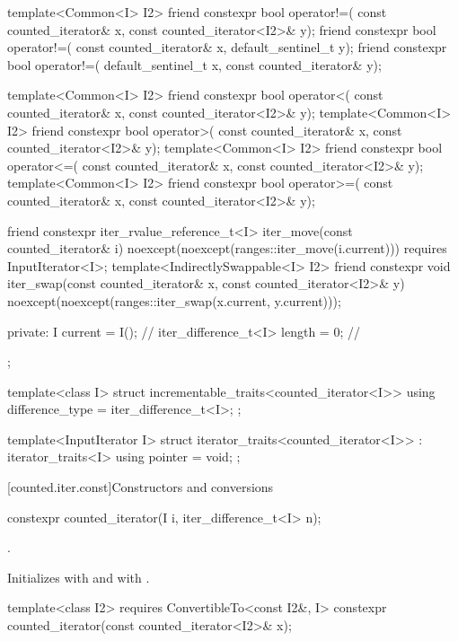 \begin{codeblock}
{{    template<Common<I> I2>
      friend constexpr bool operator!=(
        const counted_iterator& x, const counted_iterator<I2>& y);
    friend constexpr bool operator!=(
      const counted_iterator& x, default_sentinel_t y);
    friend constexpr bool operator!=(
      default_sentinel_t x, const counted_iterator& y);

    template<Common<I> I2>
      friend constexpr bool operator<(
        const counted_iterator& x, const counted_iterator<I2>& y);
    template<Common<I> I2>
      friend constexpr bool operator>(
        const counted_iterator& x, const counted_iterator<I2>& y);
    template<Common<I> I2>
      friend constexpr bool operator<=(
        const counted_iterator& x, const counted_iterator<I2>& y);
    template<Common<I> I2>
      friend constexpr bool operator>=(
        const counted_iterator& x, const counted_iterator<I2>& y);

    friend constexpr iter_rvalue_reference_t<I> iter_move(const counted_iterator& i)
      noexcept(noexcept(ranges::iter_move(i.current)))
        requires InputIterator<I>;
    template<IndirectlySwappable<I> I2>
      friend constexpr void iter_swap(const counted_iterator& x, const counted_iterator<I2>& y)
        noexcept(noexcept(ranges::iter_swap(x.current, y.current)));

  private:
    I current = I();                    // \expos
    iter_difference_t<I> length = 0;    // \expos
  };

  template<class I>
  struct incrementable_traits<counted_iterator<I>> {
    using difference_type = iter_difference_t<I>;
  };

  template<InputIterator I>
  struct iterator_traits<counted_iterator<I>> : iterator_traits<I> {
    using pointer = void;
  };
}
\end{codeblock}

[counted.iter.const]{Constructors and conversions}

%
\begin{itemdecl}
constexpr counted_iterator(I i, iter_difference_t<I> n);
\end{itemdecl}

\begin{itemdescr}
\pnum
\expects {}.

\pnum
\effects
Initializes  with  and
 with .
\end{itemdescr}

%
\begin{itemdecl}
template<class I2>
  requires ConvertibleTo<const I2&, I>
    constexpr counted_iterator(const counted_iterator<I2>& x);
\end{itemdecl}


